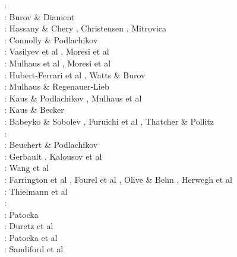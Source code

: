 \begin{scriptsize}
\nineteeneightyfour:\cite{yusa84}\\
\nineteenninetyfive: Burov \& Diament \cite{budi95}\\
\nineteenninetysix: Hassany \& Chery \cite{hach96b}, Christensen \cite{chri96b}, Mitrovica \cite{mitr96}\\
\nineteenninetyeight: Connolly \& Podlachikov \cite{copo98}\\
\twothousandone: Vasilyev et al \cite{vapy01}, Moresi et al \cite{modm01}\\
\twothousandtwo: Mulhaus et al \cite{mumh02}, Moresi et al \cite{modm02}\\
\twothousandthree: Hubert-Ferrari et al \cite{hukm03}, Watts \& Burov \cite{wabu03}\\
\twothousandfive: Mulhaus \& Regenauer-Lieb \cite{mure05}\\
\twothousandsix: Kaus \& Podlachikov \cite{kapo06}, Mulhaus et al \cite{mudm06}\\
\twothousandseven: Kaus \& Becker \cite{kabe07}\\
\twothousandeight: Babeyko \& Sobolev \cite{baso08}, Furuichi et al \cite{fukk08}, 
                   Thatcher \& Pollitz \cite{thpo08}\\
\twothousandnine: \cite{qurj09}\\
\twothousandten: Beuchert \& Podlachikov \cite{bepo10}\\
\twothousandtwelve: Gerbault \cite{gerb12}, Kalousov et al \cite{kasc12}\\
\twothousandthirteen: Wang et al \cite{wahd13}\\
\twothousandfourteen: Farrington et al \cite{famc14}, Fourel et al \cite{fogm14},
                      Olive \& Behn \cite{olbe14}, Herwegh et al \cite{hepk14}\\
\twothousandfifteen: Thielmann et al \cite{thkp15}\\
\twothousandsixteen: \cite{bafl16}\cite{jads16}\cite{olbm16}\cite{bafl16}\\
\twothousandseventeen: Patocka \cite{pact17}\\
\twothousandeighteen: Duretz et al \cite{dusd18}\\
\twothousandnineteen: Patocka et al \cite{pact19}\\
\twothousandtwenty: Sandiford et al \cite{sams20}
\end{scriptsize}

